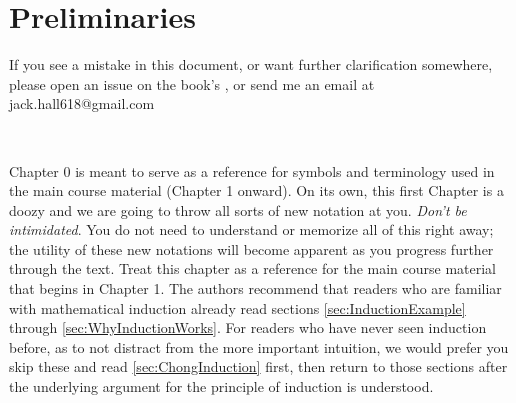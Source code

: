 

\chapter{Preliminaries}
If you see a mistake in this document, or want further clarification somewhere, please open an issue on the book's \href{https://github.com/hilikliming/modern_algebra_with_friends}{}, or send me an email at jack.hall618@gmail.com \steezybreak \\
\noindent 
\begin{tcolorbox}
    \begin{center}
\\
    \end{center}
\end{tcolorbox}


\bigbreak
\noindent Chapter 0 is meant to serve as a reference for symbols and terminology used in the main course material (Chapter 1 onward). On its own, this first Chapter is a doozy and we are going to throw all sorts of new notation at you. \textit{Don't be intimidated}. You do not need to understand or memorize all of this right away; the utility of these new notations will become apparent as you progress further through the text. Treat this chapter as a reference for the main course material that begins in Chapter 1. The authors recommend that readers who are familiar with mathematical induction already read sections \ref{sec:InductionExample} through \ref{sec:WhyInductionWorks}. For readers who have never seen induction before, as to not distract from the more important intuition, we would prefer you skip these and read \ref{sec:ChongInduction} first, then return to those sections after the underlying argument for the principle of induction is understood.

